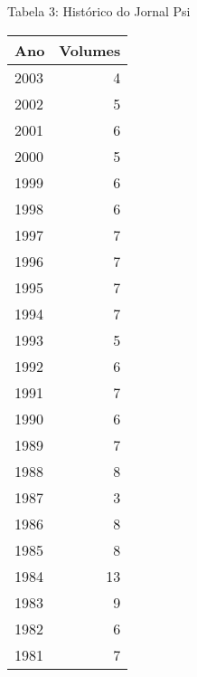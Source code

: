 \documentclass{beamer}
\begin{document}
\begin{frame}{Tabela 3: Histórico do Jornal Psi}
\begin{multicols}{2}
    \begin{tabular}{l r}
        \toprule
        \textbf{Ano} & \textbf{Volumes} \\
        \midrule
        2003 & 4 \\
        2002 & 5 \\
        2001 & 6 \\
        2000 & 5 \\
        1999 & 6 \\
        1998 & 6 \\
        1997 & 7 \\
        1996 & 7 \\
        1995 & 7 \\
        1994 & 7 \\
        1993 & 5 \\
        1992 & 6 \\
        1991 & 7 \\
        1990 & 6 \\
        1989 & 7 \\
        1988 & 8 \\
        1987 & 3 \\
        1986 & 8 \\
        1985 & 8 \\
        1984 & 13 \\
        1983 & 9 \\
        1982 & 6 \\
        1981 & 7 \\
        \bottomrule
    \end{tabular}
    \end{multicols}
\end{frame}


\end{document}
